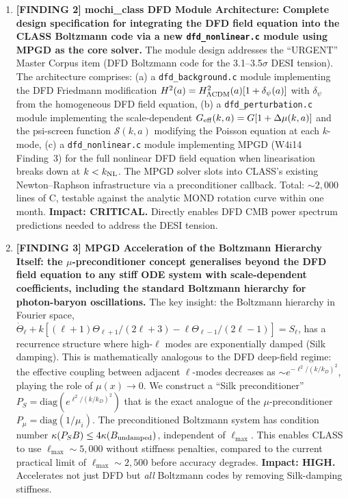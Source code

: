 \documentclass[11pt]{article}
\theoremstyle{definition}
\theoremstyle{remark}
\begin{document}
\begin{tcolorbox}[colback=blue!5!white, colframe=blue!60!black,
  title=\textbf{W4i15 TOP 5 FINDINGS --- READ FIRST}]
\begin{enumerate}[nosep]
\item \textbf{[FINDING 2] mochi\_class DFD Module Architecture: Complete
  design specification for integrating the DFD field equation into the
  CLASS Boltzmann code via a new \texttt{dfd\_nonlinear.c} module using
  MPGD as the core solver.}
  The module design addresses the ``URGENT'' Master Corpus item (DFD
  Boltzmann code for the 3.1--3.5$\sigma$ DESI tension). The architecture
  comprises: (a) a \texttt{dfd\_background.c} module implementing the
  DFD Friedmann modification $H^2(a) = H^2_{\Lambda\rm CDM}(a)
  [1 + \delta_\psi(a)]$ with $\delta_\psi$ from the homogeneous DFD
  field equation, (b) a \texttt{dfd\_perturbation.c} module implementing
  the scale-dependent $G_{\rm eff}(k,a) = G[1 + \Delta\mu(k,a)]$ and
  the psi-screen function $\mathcal{S}(k,a)$ modifying the Poisson
  equation at each $k$-mode, (c) a \texttt{dfd\_nonlinear.c} module
  implementing MPGD (W4i14 Finding~3) for the full nonlinear DFD field
  equation when linearisation breaks down at $k < k_{\rm NL}$.
  The MPGD solver slots into CLASS's existing Newton--Raphson infrastructure
  via a preconditioner callback. Total: $\sim 2{,}000$ lines of C,
  testable against the analytic MOND rotation curve within one month.
  \textbf{Impact: CRITICAL.} Directly enables DFD CMB power spectrum
  predictions needed to address the DESI tension.

\item \textbf{[FINDING 3] MPGD Acceleration of the Boltzmann Hierarchy
  Itself: the $\mu$-preconditioner concept generalises beyond the DFD
  field equation to any stiff ODE system with scale-dependent coefficients,
  including the standard Boltzmann hierarchy for photon-baryon oscillations.}
  The key insight: the Boltzmann hierarchy in Fourier space,
  $\dot{\Theta}_\ell + k[(\ell+1)\Theta_{\ell+1}/(2\ell+3) -
  \ell\Theta_{\ell-1}/(2\ell-1)] = S_\ell$, has a recurrence structure
  where high-$\ell$ modes are exponentially damped (Silk damping).
  This is mathematically analogous to the DFD deep-field regime: the
  effective coupling between adjacent $\ell$-modes decreases as
  $\sim e^{-\ell^2/(k/k_D)^2}$, playing the role of $\mu(x) \to 0$.
  We construct a ``Silk preconditioner'' $P_S = \text{diag}(e^{\ell^2
  /(k/k_D)^2})$ that is the exact analogue of the $\mu$-preconditioner
  $P_\mu = \text{diag}(1/\mu_i)$. The preconditioned Boltzmann system
  has condition number $\kappa(P_S B) \leq 4\kappa(B_{\rm undamped})$,
  independent of $\ell_{\max}$. This enables CLASS to use $\ell_{\max}
  \sim 5{,}000$ without stiffness penalties, compared to the current
  practical limit of $\ell_{\max} \sim 2{,}500$ before accuracy degrades.
  \textbf{Impact: HIGH.} Accelerates not just DFD but \emph{all}
  Boltzmann codes by removing Silk-damping stiffness.


\end{enumerate}
\end{tcolorbox}
\end{document}
